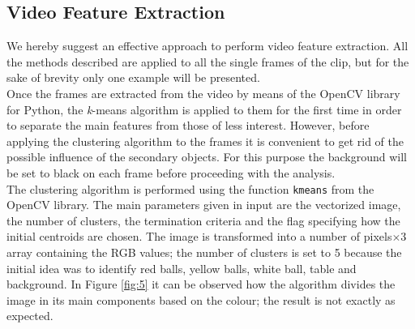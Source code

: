 \documentclass{usiinftr}
\begin{document}
\subsection{Video Feature Extraction}
We hereby suggest an effective approach to perform video feature extraction. All the methods described are applied to all the single frames of the clip, but for the sake of brevity only one example will be presented.  \\
Once the frames are extracted from the video by means of the OpenCV library for Python, the \textit{k}-means algorithm is applied to them for the first time in order to separate the main features from those of less interest. However, before applying the clustering algorithm to the frames it is convenient to get rid of the possible influence of the secondary objects. For this purpose the background will be set to black on each frame before proceeding with the analysis. \\
The clustering algorithm is performed using the function \texttt{kmeans} from the OpenCV library. The main parameters given in input are the vectorized image, the number of clusters, the termination criteria  and the flag specifying how the initial centroids are chosen. The image is transformed into a number of pixels$\times 3$ array containing the RGB values; the number of clusters is set to 5 because the initial idea was to identify red balls, yellow balls, white ball, table and background. 
In Figure \ref{fig:5} it can be observed how the algorithm divides the image in its main components based on the colour; the result is not exactly as expected. 
\end{document}
